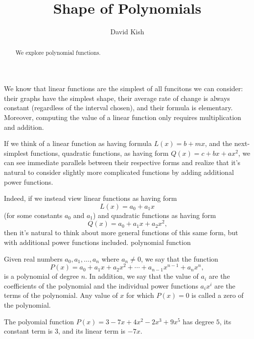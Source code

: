\documentclass{ximera}
\author{David Kish}
\title{Shape of Polynomials}
\begin{document}
\begin{abstract}
We explore polynomial functions.
\end{abstract}
\maketitle

We know that linear functions are the simplest of all funcitons we can consider:  their graphs have the simplest shape, their average rate of change is always constant (regardless of the interval chosen), and their formula is elementary.  Moreover, computing the value of a linear function only requires multiplication and addition.%

If we think of a linear function as having formula $L(x) = b + mx$, and the next-simplest functions, quadratic functions, as having form $Q(x) = c + bx + ax^2$, we can see immediate parallels between their respective forms and realize that it's natural to consider slightly more complicated functions by adding additional power functions.%

Indeed, if we instead view linear functions as having form
\[
L(x) = a_0 + a_1 x
\]
(for some constants $a_0$ and $a_1$) and quadratic functions as having form%
\[
Q(x) = a_0 + a_1 x + a_2 x^2\text{,}
\]
then it's natural to think about more general functions of this same form, but with additional power functions included.%
polynomial function

Given real numbers $a_0, a_1, \ldots, a_n$ where $a_n \ne 0$, we say that the function%
\[
P(x) = a_0 + a_1 x + a_2 x^2 + \cdots + a_{n-1}x^{n-1} + a_n x^n, 
\]
is a polynomial of degree $n$.  In addition, we say that the value of $a_i$ are the coefficients of the polynomial and the individual power functions $a_i x^i$ are the terms of the polynomial.   Any value of $x$ for which $P(x) = 0$ is called a zero of the polynomial. 

\begin{example}%

The polyomial function $P(x) = 3 - 7x + 4x^2 - 2x^3 + 9x^5$ has degree $5$, its constant term is $3$, and its linear term is $-7x$.%
\end{example}
\end{document}
